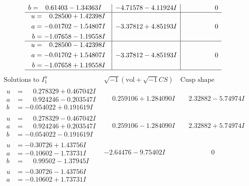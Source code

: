 \documentclass[1p]{elsarticle_modified}
\theoremstyle{definition}
\newcommand{\I}{\sqrt{-1}}
\begin{document}
$$\begin{array}{c|c|c}
\begin{aligned}
b &= \phantom{-}0.61403 - 1.34363 I\end{aligned}
 & -4.71578 - 4.11924 I & \phantom{-0.000000 } 0 \\ \hline\begin{aligned}
u &= \phantom{-}0.28500 + 1.42398 I \\
a &= -0.01702 - 1.54807 I \\
b &= -1.07658 - 1.19558 I\end{aligned}
 & -3.37812 + 4.85193 I & \phantom{-0.000000 } 0 \\ \hline\begin{aligned}
u &= \phantom{-}0.28500 - 1.42398 I \\
a &= -0.01702 + 1.54807 I \\
b &= -1.07658 + 1.19558 I\end{aligned}
 & -3.37812 - 4.85193 I & \phantom{-0.000000 } 0\\
 \hline 
 \end{array}$$\newpage$$\begin{array}{c|c|c}  
\text{Solutions to }I^u_{1}& \I (\text{vol} + \sqrt{-1}CS) & \text{Cusp shape}\\
 \hline 
\begin{aligned}
u &= \phantom{-}0.278329 + 0.467042 I \\
a &= \phantom{-}0.924246 - 0.203547 I \\
b &= -0.054022 + 0.191619 I\end{aligned}
 & \phantom{-}0.259106 + 1.284090 I & \phantom{-}2.32882 - 5.74974 I \\ \hline\begin{aligned}
u &= \phantom{-}0.278329 - 0.467042 I \\
a &= \phantom{-}0.924246 + 0.203547 I \\
b &= -0.054022 - 0.191619 I\end{aligned}
 & \phantom{-}0.259106 - 1.284090 I & \phantom{-}2.32882 + 5.74974 I \\ \hline\begin{aligned}
u &= -0.30726 + 1.43756 I \\
a &= -0.10602 - 1.73731 I \\
b &= \phantom{-}0.99502 - 1.37945 I\end{aligned}
 & -2.64476 - 9.75402 I & \phantom{-0.000000 } 0 \\ \hline\begin{aligned}
u &= -0.30726 - 1.43756 I \\
a &= -0.10602 + 1.73731 I \\

\end{aligned}
\end{array}$$
\end{document}
